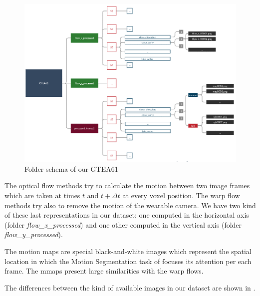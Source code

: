\documentclass[10pt,twocolumn,hidelinks,letterpaper]{article}
\begin{document}
\begin{figure}
	\centering
	\includegraphics[width=.9\linewidth]{images/folder_schema.png}
	\caption{Folder schema of our GTEA61}
	\label{folder_schema}
\end{figure}

The optical flow methods try to calculate the motion between two image frames which are taken at times $t$ and $t + \Delta t$ at every voxel position. The warp flow methods try also to remove the motion of the wearable camera. We have two kind of these last representations in our dataset: one computed in the horizontal axis (folder \textit{flow\_x\_processed}) and one other computed in the vertical axis (folder \textit{flow\_y\_processed}).

The motion maps are special black-and-white images which represent the spatial location in which the Motion Segmentation task of \cite{sparnet} focuses its attention per each frame. The mmaps present large similarities with the warp flows.

The differences between the kind of available images in our dataset are shown in .
\end{document}
